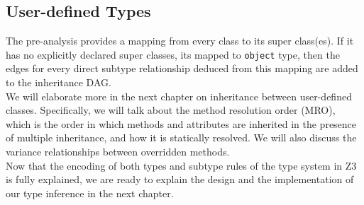 \subsection{User-defined Types}
The pre-analysis provides a mapping from every class to its super class(es). If it has no explicitly declared super classes, its mapped to \lstinline|object| type, then the edges for every direct subtype relationship deduced from this mapping are added to the inheritance DAG. \\

We will elaborate more in the next chapter on inheritance between user-defined classes. Specifically, we will talk about the method resolution order (MRO), which is the order in which methods and attributes are inherited in the presence of multiple inheritance, and how it is statically resolved. We will also discuss the variance relationships between overridden methods.\\

Now that the encoding of both types and subtype rules of the type system in Z3 is fully explained, we are ready to explain the design and the implementation of our type inference in the next chapter.